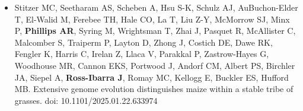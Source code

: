 \documentclass[letterpaper,10pt]{article}
\begin{document}
\begin{itemize}
\item Stitzer MC, Seetharam AS, Scheben A, Hsu S-K, Schulz AJ, AuBuchon-Elder T,   El-Walid M, Ferebee TH, Hale CO,  La T,  Liu Z-Y,  McMorrow SJ,  Minx P, \textbf{Phillips AR},  Syring M,  Wrightsman T,  Zhai J,  Pasquet R,  McAllister C,  Malcomber S,  Traiperm P,  Layton D,  Zhong J,  Costich DE, Dawe RK,  Fengler K,  Harris C,  Irelan Z,  Llaca V,  Parakkal P,  Zastrow-Hayes G,  Woodhouse MR,  Cannon EKS,  Portwood J,  Andorf CM,  Albert PS, Birchler JA,  Siepel A, \textbf{Ross-Ibarra J}, Romay MC,  Kellogg E,  Buckler ES, Hufford MB.  Extensive genome evolution distinguishes maize within a stable tribe of grasses.  doi: 10.1101/2025.01.22.633974  \\

\end{itemize}

\end{document}
